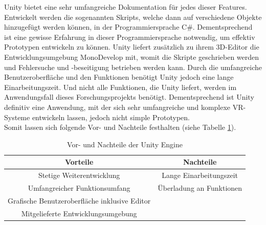 \documentclass[a4paper,12pt,oneside]{article}
\begin{document}
        Unity bietet eine sehr umfangreiche Dokumentation für jedes dieser Features.
        Entwickelt werden die sogenannten Skripts, welche dann auf verschiedene Objekte
        hinzugefügt werden können, in der Programmiersprache C\#. Dementsprechend ist eine
        gewisse Erfahrung in dieser Programmiersprache notwendig, um effektiv Prototypen
        entwickeln zu können. Unity liefert zusätzlich zu ihrem 3D-Editor die 
        Entwicklungsumgebung MonoDevelop mit, womit die Skripte geschrieben werden und
        Fehlersuche und -beseitigung betrieben werden kann.
        Durch die umfangreiche Benutzeroberfläche und den Funktionen benötigt Unity jedoch 
        eine lange Einarbeitungszeit. Und nicht alle Funktionen, die Unity liefert, werden
        im Anwendungsfall dieses Forschungsprojekts benötigt. Dementsprechend ist Unity
        definitiv eine Anwendung, mit der sich sehr umfangreiche und komplexe VR-Systeme
        entwickeln lassen, jedoch nicht simple Prototypen.\\
        Somit lassen sich folgende Vor- und Nachteile festhalten (siehe Tabelle \ref{tab:vor-und-nachteile-unity}).
          \begin{table}[h]
            \begin{center}
              \begin{tabular}{| c | c |}
                \hline
                \textbf{Vorteile} & \textbf{Nachteile} \\ \hline
                Stetige Weiterentwicklung & Lange Einarbeitungszeit \\ \hline
                Umfangreicher Funktionsumfang & Überladung an Funktionen \\ \hline
                Grafische Benutzeroberfläche inklusive Editor & \\ \hline
                Mitgelieferte Entwicklungsumgebung & \\
                \hline
              \end{tabular}
              \caption{Vor- und Nachteile der Unity Engine\label{tab:vor-und-nachteile-unity}}
            \end{center}
          \end{table}
\end{document}

